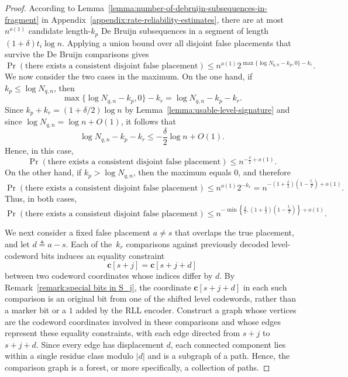 \documentclass[10pt,a4paper]{amsart}
\newcommand{\boldc}{\mathbf{c}}
\begin{document}
\begin{proof}
According to
Lemma~\ref{lemma:number-of-debruijn-subsequences-in-fragment} in Appendix~\ref{appendix:rate-reliability-estimates}, there are
at most \(n^{o(1)}\) candidate length-\(k_p\) De Bruijn subsequences in
a segment of length \((1+\delta)t_i\log n\).
Applying a union bound over all disjoint false placements that survive
the De Bruijn comparisons gives
\[
\Pr\left(
\text{there exists a consistent disjoint false placement}
\right)
\leq
n^{o(1)}
2^{\max\{\log N_{q,n}-k_p,0\}-k_r}.
\]
We now consider the two cases in the maximum.
On the one hand, if \(k_p\leq\log N_{q,n}\), then
\[
\max\{\log N_{q,n}-k_p,0\}-k_r
=
\log N_{q,n}-k_p-k_r.
\]
Since
\(k_p+k_r=(1+\delta/2)\log n\) by Lemma~\ref{lemma:usable-level-signature} and since \(\log N_{q,n}=\log n+O(1)\), it follows that
\[
\log N_{q,n}-k_p-k_r
\leq
-\frac{\delta}{2}\log n+O(1).
\]
Hence, in this case,
\[
\Pr\left(
\text{there exists a consistent disjoint false placement}
\right)
\leq
n^{-\frac{\delta}{2}+o(1)}.
\]
On the other hand, if \(k_p>\log N_{q,n}\), then the maximum equals \(0\), and therefore
\[
\Pr\left(
\text{there exists a consistent disjoint false placement}
\right)
\leq
n^{o(1)}2^{-k_r}
=
n^{-\left(1+\frac{\delta}{2}\right)
\left(1-\frac{t_i}{T}\right)+o(1)}.
\]
Thus, in both cases,
\begin{equation}\label{equation:disjoint false placement}
    \Pr\left(
\text{there exists a consistent disjoint false placement}
\right)
\leq
n^{-\min\left\{
\frac{\delta}{2},
\left(1+\frac{\delta}{2}\right)
\left(1-\frac{t_i}{T}\right)
\right\}+o(1)}.
\end{equation}



We next consider a fixed false placement \(a\neq s\) that overlaps the
true placement, and let \(d\triangleq a-s\). Each of the~\(k_r\)
comparisons against previously decoded level-codeword bits induces an
equality constraint
\[
\boldc[s+j]=\boldc[s+j+d]
\]
between two codeword coordinates whose indices differ by \(d\). By
Remark~\ref{remark:special bits in S_j}, the coordinate
\(\boldc[s+j+d]\) in each such comparison is an original bit from one
of the shifted level codewords, rather than a marker bit or a \(1\)
added by the RLL encoder.
Construct a graph whose vertices are the codeword coordinates involved
in these comparisons and whose edges represent these equality
constraints, with each edge directed from \(s+j\) to \(s+j+d\).
Since every edge has displacement \(d\), each connected component lies
within a single residue class modulo \(|d|\) and is a subgraph of a
path. Hence, the comparison graph is a forest, or more specifically, a
collection of paths.


\end{proof}
\end{document}
